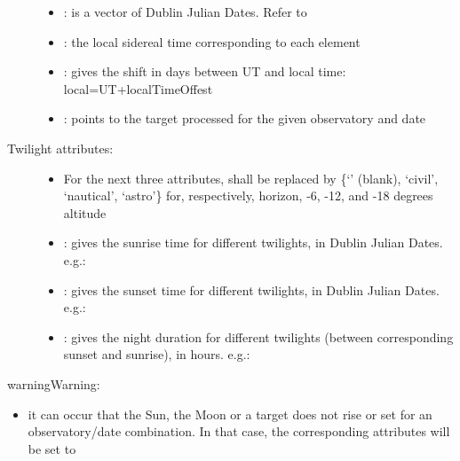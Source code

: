 \documentclass[letterpaper,10pt,english]{sphinxmanual}
\begin{document}
\begin{fulllineitems}
\begin{description}
\begin{itemize}
\item {} 
: is a vector of Dublin Julian Dates. Refer to 

\item {} 
: the local sidereal time corresponding to each  element

\item {} 
: gives the shift in days between UT and local time: local=UT+localTimeOffest

\item {} 
: points to the  target processed for the given observatory and date

\end{itemize}

\item[{Twilight attributes:}] \leavevmode\begin{itemize}
\item {} 
For the next three attributes,  shall be replaced by \{`' (blank), `civil', `nautical', `astro'\} for, respectively, horizon, -6, -12, and -18 degrees altitude

\item {} 
: gives the sunrise time for different twilights, in Dublin Julian Dates. e.g.: 

\item {} 
: gives the sunset time for different twilights, in Dublin Julian Dates. e.g.: 

\item {} 
: gives the night duration for different twilights (between corresponding sunset and sunrise), in hours. e.g.: 

\end{itemize}

\end{description}

\begin{notice}{warning}{Warning:}\begin{itemize}
\item {} 
it can occur that the Sun, the Moon or a target does not rise or set for an observatory/date combination. In that case, the corresponding attributes will be set to 

\end{itemize}
\end{notice}


\end{fulllineitems}
\end{document}
